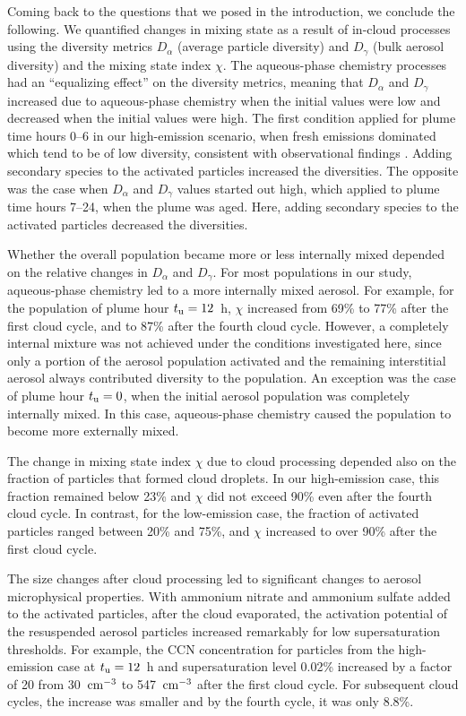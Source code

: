 \documentclass[edeposit,fullpage]{uiucthesis2009}
\begin{document}
Coming back to the questions that we posed in the introduction, we
conclude the following. We quantified changes in mixing state as a result of in-cloud
processes using the diversity metrics $D_{\alpha}$ (average particle
diversity) and $D_{\gamma}$ (bulk aerosol diversity) and the mixing
state index $\chi$. The aqueous-phase chemistry processes had an
``equalizing effect'' on the diversity metrics, meaning that
$D_{\alpha}$ and $D_{\gamma}$ increased due to aqueous-phase chemistry
when the initial values were low and decreased when the initial values
were high. The first condition applied for plume time hours 0--6 in
our high-emission scenario, when fresh emissions dominated
which tend to be of low diversity, consistent with observational
findings \citep{Healy2014}. Adding secondary species to the activated
particles increased the diversities. The opposite was the case when
$D_{\alpha}$ and $D_{\gamma}$ values started out high, which applied
to plume time hours 7--24, when the plume was aged. Here, adding
secondary species to the activated particles decreased the
diversities.

Whether the overall population became more or less internally mixed
depended on the relative changes in $D_{\alpha}$ and $D_{\gamma}$. For
most populations in our study, aqueous-phase chemistry led to a more
internally mixed aerosol. For example, for the population of plume
hour $t_{\rm u}=12$~h, $\chi$ increased from 69\% to 77\% after the
first cloud cycle, and to 87\% after the fourth cloud cycle. However,
a completely internal mixture was not achieved under the conditions
investigated here, since only a portion of the aerosol population
activated and the remaining interstitial aerosol always contributed
diversity to the population. An exception was the case of plume hour
$t_{\rm u} = 0$, when the initial aerosol population was completely
internally mixed. In this case, aqueous-phase chemistry caused the
population to become more externally mixed.

The change in mixing state index $\chi$ due to cloud processing
  depended also on the fraction of particles that formed cloud
  droplets. In our high-emission case, this fraction remained below
  23\% and $\chi$ did not exceed 90\% even after the fourth cloud
  cycle. In contrast, for the low-emission case, the fraction of
  activated particles ranged between 20\% and 75\%, and $\chi$
  increased to over 90\%  after the first cloud cycle.

The size changes after cloud processing led to significant changes to
aerosol microphysical properties. With ammonium nitrate and ammonium
sulfate added to the activated particles, after the cloud evaporated,
the activation potential of the resuspended aerosol particles
increased remarkably for low supersaturation thresholds. For example,
the CCN concentration for particles from the high-emission case
  at $t_{\rm u}=12$~h and supersaturation level 0.02\% increased by a
factor of 20 from 30~$\rm cm^{-3}$ to 547~$\rm cm^{-3}$ after the
first cloud cycle. For subsequent cloud cycles, the increase was
smaller and by the fourth cycle, it was only 8.8\%.
\end{document}
